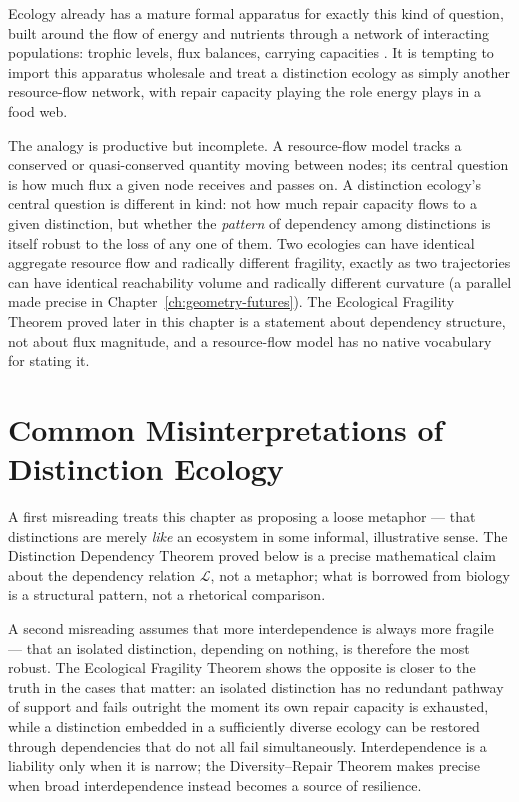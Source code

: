 \documentclass[12pt,twoside,openright]{book}
\begin{document}
Ecology already has a mature formal apparatus for exactly
this kind of question, built around the flow of energy and
nutrients through a network of interacting populations:
trophic levels, flux balances, carrying capacities
\parencite{holling1973}. It is tempting to import this
apparatus wholesale and treat a distinction ecology as simply
another resource-flow network, with repair capacity playing
the role energy plays in a food web.

The analogy is productive but incomplete. A resource-flow
model tracks a conserved or quasi-conserved quantity moving
between nodes; its central question is how much flux a given
node receives and passes on. A distinction ecology's central
question is different in kind: not how much repair capacity
flows to a given distinction, but whether the \emph{pattern}
of dependency among distinctions is itself robust to the loss
of any one of them. Two ecologies can have identical aggregate
resource flow and radically different fragility, exactly as
two trajectories can have identical reachability volume and
radically different curvature (a parallel made precise in
Chapter~\ref{ch:geometry-futures}). The Ecological Fragility
Theorem proved later in this chapter is a statement about
dependency structure, not about flux magnitude, and a
resource-flow model has no native vocabulary for stating it.

\section{Common Misinterpretations of Distinction Ecology}
\label{sec:ch12-misinterpretations}

A first misreading treats this chapter as proposing a loose
metaphor --- that distinctions are merely \emph{like} an
ecosystem in some informal, illustrative sense. The
Distinction Dependency Theorem proved below is a precise
mathematical claim about the dependency relation
$\mathcal{L}$, not a metaphor; what is borrowed from biology
is a structural pattern, not a rhetorical comparison.

A second misreading assumes that more interdependence is
always more fragile --- that an isolated distinction,
depending on nothing, is therefore the most robust. The
Ecological Fragility Theorem shows the opposite is closer to
the truth in the cases that matter: an isolated distinction
has no redundant pathway of support and fails outright the
moment its own repair capacity is exhausted, while a
distinction embedded in a sufficiently diverse ecology can be
restored through dependencies that do not all fail
simultaneously. Interdependence is a liability only when it
is narrow; the Diversity--Repair Theorem makes precise when
broad interdependence instead becomes a source of resilience.
\end{document}
